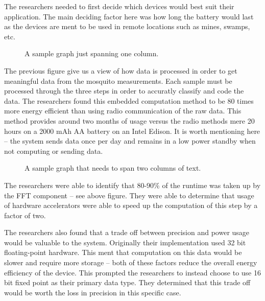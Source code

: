 \documentclass{sig-alternate}
\begin{document}
The researchers needed to first decide which devices would best suit their application. The main deciding factor here was how long the battery would last as the devices are ment to be used in remote locations such as mines, swamps, etc. 


\begin{figure}
\centering
{}
\caption{A sample graph just spanning one column.}
\label{fig:singleColumnFigure1}
\end{figure}

The previous figure give us a view of how data is processed in order to get meaningful data from the mosquito measurements. Each sample must be processed through the three steps in order to accuratly classify and code the data. The researchers found this embedded computation method to be 80 times more energy efficient than using radio communication of the raw data. This method provides around two months of usage versus the radio methods mere 20 hours on a 2000 mAh AA battery on an Intel Edison. It is worth mentioning here -- the system sends data once per day and remains in a low power standby when not computing or sending data.


\begin{figure*}
\centering
{}
\caption{A sample graph that needs to span two columns of text.}
\label{fig:twoColumnFigure1}
\end{figure*}

The researchers were able to identify that 80-90\% of the runtime was taken up by the FFT component -- see above figure. They were able to determine that usage of hardware accelerators were able to speed up the computation of this step by a factor of two.

The researchers also found that a trade off between precision and power usage would be valuable to the system. Originally their implementation used 32 bit floating-point hardware. This ment that computation on this data would be slower and require more storage -- both of these factors reduce the overall energy efficiency of the device. This prompted the researchers to instead choose to use 16 bit fixed point as their primary data type. They determined that this trade off would be worth the loss in precision in this specific case.
\end{document}
